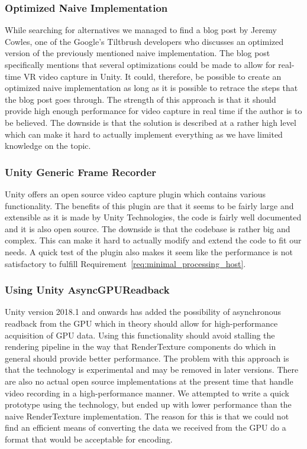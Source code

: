 \subsubsection{Optimized Naive Implementation}
While searching for alternatives we managed to find a blog post\cite{google_vrCaptureBlog} by Jeremy Cowles, one of the Google's Tiltbrush developers who discusses an optimized version of the previously mentioned naive implementation. The blog post specifically mentions that several optimizations could be made to allow for real-time VR video capture in Unity. It could, therefore, be possible to create an optimized naive implementation as long as it is possible to retrace the steps that the blog post goes through. The strength of this approach is that it should provide high enough performance for video capture in real time if the author is to be believed. The downside is that the solution is described at a rather high level which can make it hard to actually implement everything as we have limited knowledge on the topic. 

\subsubsection{Unity Generic Frame Recorder}
Unity offers an open source video capture plugin\cite{unity_genericFrameRecprder} which contains various functionality. The benefits of this plugin are that it seems to be fairly large and extensible as it is made by Unity Technologies, the code is fairly well documented and it is also open source. The downside is that the codebase is rather big and complex. This can make it hard to actually modify and extend the code to fit our needs. A quick test of the plugin also makes it seem like the performance is not satisfactory to fulfill Requirement~\ref{req:minimal_processing_host}.

\subsubsection{Using Unity AsyncGPUReadback}
Unity version 2018.1 and onwards has added the possibility of asynchronous readback from the GPU\cite{unity_asyncReadback} which in theory should allow for high-performance acquisition of GPU data. Using this functionality should avoid stalling the rendering pipeline in the way that RenderTexture components do which in general should provide better performance. The problem with this approach is that the technology is experimental and may be removed in later versions. There are also no actual open source implementations at the present time that handle video recording in a high-performance manner. We attempted to write a quick prototype using the technology, but ended up with lower performance than the naive RenderTexture implementation. The reason for this is that we could not find an efficient means of converting the data we received from the GPU do a format that would be acceptable for encoding.  


